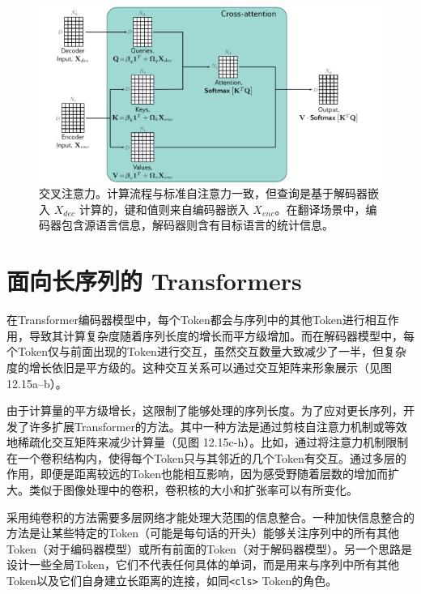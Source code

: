 \begin{figure}[ht!]
\centering
\includegraphics[width=0.7\linewidth]{png/chapter12/TransformerBlockSACross.png}
\caption{交叉注意力。计算流程与标准自注意力一致，但查询是基于解码器嵌入 \(X_{dec}\) 计算的，键和值则来自编码器嵌入 \(X_{enc}\)。在翻译场景中，编码器包含源语言信息，解码器则含有目标语言的统计信息。}
\end{figure}

\section{面向长序列的 Transformers}
在Transformer编码器模型中，每个Token都会与序列中的其他Token进行相互作用，导致其计算复杂度随着序列长度的增长而平方级增加。而在解码器模型中，每个Token仅与前面出现的Token进行交互，虽然交互数量大致减少了一半，但复杂度的增长依旧是平方级的。这种交互关系可以通过交互矩阵来形象展示（见图 12.15a–b）。

由于计算量的平方级增长，这限制了能够处理的序列长度。为了应对更长序列，开发了许多扩展Transformer的方法。其中一种方法是通过剪枝自注意力机制或等效地稀疏化交互矩阵来减少计算量（见图 12.15c-h）。比如，通过将注意力机制限制在一个卷积结构内，使得每个Token只与其邻近的几个Token有交互。通过多层的作用，即便是距离较远的Token也能相互影响，因为感受野随着层数的增加而扩大。类似于图像处理中的卷积，卷积核的大小和扩张率可以有所变化。

采用纯卷积的方法需要多层网络才能处理大范围的信息整合。一种加快信息整合的方法是让某些特定的Token（可能是每句话的开头）能够关注序列中的所有其他Token（对于编码器模型）或所有前面的Token（对于解码器模型）。另一个思路是设计一些全局Token，它们不代表任何具体的单词，而是用来与序列中所有其他Token以及它们自身建立长距离的连接，如同\texttt{\textless cls\textgreater} Token的角色。

